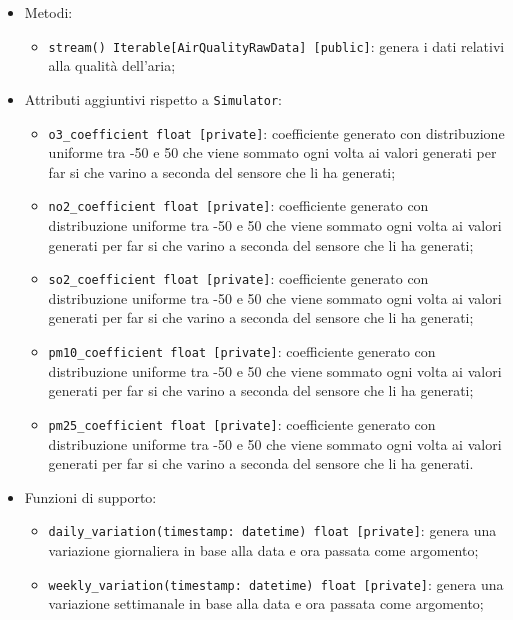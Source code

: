 \begin{itemize}
	      \begin{itemize}
		      \item Metodi:
		            \begin{itemize}
			            \item \texttt{stream() Iterable[AirQualityRawData] [public]}: genera i dati relativi alla qualità dell'aria;
		            \end{itemize}
		      \item Attributi aggiuntivi rispetto a \texttt{Simulator}:
		            \begin{itemize}
			            \item \texttt{o3\_coefficient float [private]}: coefficiente generato con distribuzione uniforme tra -50 e 50 che viene sommato ogni volta ai valori generati per far si che varino a seconda del sensore che li ha generati;
			            \item \texttt{no2\_coefficient float [private]}: coefficiente generato con distribuzione uniforme tra -50 e 50 che viene sommato ogni volta ai valori generati per far si che varino a seconda del sensore che li ha generati;
			            \item \texttt{so2\_coefficient float [private]}: coefficiente generato con distribuzione uniforme tra -50 e 50 che viene sommato ogni volta ai valori generati per far si che varino a seconda del sensore che li ha generati;
			            \item \texttt{pm10\_coefficient float [private]}: coefficiente generato con distribuzione uniforme tra -50 e 50 che viene sommato ogni volta ai valori generati per far si che varino a seconda del sensore che li ha generati;
			            \item \texttt{pm25\_coefficient float [private]}: coefficiente generato con distribuzione uniforme tra -50 e 50 che viene sommato ogni volta ai valori generati per far si che varino a seconda del sensore che li ha generati.
		            \end{itemize}
		      \item Funzioni di supporto:
		            \begin{itemize}
			            \item \texttt{daily\_variation(timestamp: datetime) float [private]}: genera una variazione giornaliera in base alla data e ora passata come argomento;
			            \item \texttt{weekly\_variation(timestamp: datetime) float [private]}: genera una variazione settimanale in base alla data e ora passata come argomento;

\end{itemize}
\end{itemize}
\end{itemize}
